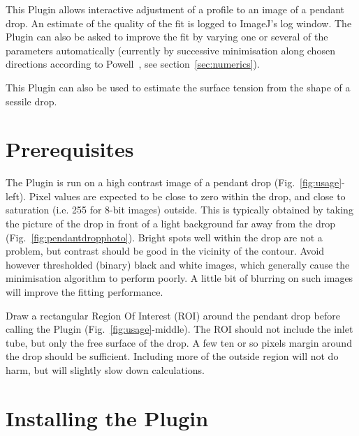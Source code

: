 \documentclass[fleqn]{scrartcl}
\begin{document}
This Plugin allows interactive adjustment of a profile to an image of
a pendant drop. An estimate of the quality of the fit is logged to
ImageJ's log window. The Plugin can also be asked to improve the fit
by varying one or several of the parameters automatically (currently
by successive minimisation along chosen directions according to
Powell~\cite{Powell1965,Brandt1992}, see section~\ref{sec:numerics}).

This Plugin can also be used to estimate the surface tension from the
shape of a sessile drop.


\section{Prerequisites}
\label{sec:prerequisites}

The Plugin is run on a high contrast image of a pendant drop
(Fig.~\ref{fig:usage}-left). Pixel values are expected to be close to
zero within the drop, and close to saturation (i.e. 255 for 8-bit
images) outside. This is typically obtained by taking the picture of
the drop in front of a light background far away from the drop
(Fig.~\ref{fig:pendantdropphoto}). Bright spots well within the drop
are not a problem, but contrast should be good in the vicinity of the
contour. Avoid however thresholded (binary) black and white images,
which generally cause the minimisation algorithm to perform poorly. A
little bit of blurring on such images will improve the fitting
performance.

Draw a rectangular Region Of Interest (ROI) around the pendant drop
before calling the Plugin (Fig.~\ref{fig:usage}-middle). The ROI
should not include the inlet tube, but only the free surface of the
drop. A few ten or so pixels margin around the drop should be
sufficient. Including more of the outside region will not do harm, but
will slightly slow down calculations.


\section{Installing the Plugin}
\label{sec:installation}
\end{document}

